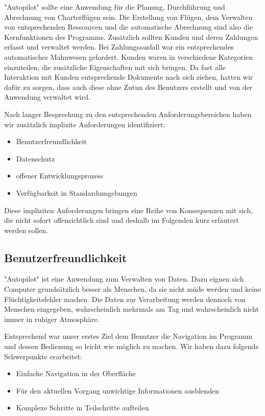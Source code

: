 \documentclass[12pt]{article}
\begin{document}
"Autopilot" sollte eine Anwendung für die Planung, Durchführung und Abrechnung von Charterflügen sein. Die Erstellung von Flügen, dem Verwalten von entsprechenden Ressourcen und die automatische Abrechnung sind also die Kernfunktionen des Programms. Zusätzlich sollten Kunden und deren Zahlungen erfasst und verwaltet werden. Bei Zahlungsausfall war ein entsprechendes automatisches Mahnwesen gefordert. Kunden waren in verschiedene Kategorien einzuteilen, die zusätzliche Eigenschaften mit sich bringen. Da fast alle Interaktion mit Kunden entsprechende Dokumente nach sich ziehen, hatten wir dafür zu sorgen, dass auch diese ohne Zutun des Benutzers erstellt und von der Anwendung verwaltet wird.
\newline

Nach langer Besprechung zu den entsprechenden Anforderungsbereichen haben wir zusätzlich implizite Anforderungen identifiziert:
\begin{itemize}
  \item Benutzerfreundlichkeit
  \item Datenschutz
  \item offener Entwicklungsprozess
  \item Verfügbarkeit in Standardumgebungen
\end{itemize}
\newline

Diese impliziten Anforderungen bringen eine Reihe von Konsequenzen mit sich, die nicht sofort offensichtlich sind und deshalb im Folgenden kurz erläutert werden sollen.

\subsection{Benutzerfreundlichkeit}

"Autopilot" ist eine Anwendung zum Verwalten von Daten. Dazu eignen sich Computer grundsätzlich besser als Menschen, da sie nicht müde werden und keine Flüchtigkeitsfehler machen. Die Daten zur Verarbeitung werden dennoch von Menschen eingegeben, wahrscheinlich mehrmals am Tag und wahrscheinlich nicht immer in ruhiger Atmosphäre.
\newline

Entsprechend war unser erstes Ziel dem Benutzer die Navigation im Programm und dessen Bedienung so leicht wie möglich zu machen. Wir haben dazu folgende Schwerpunkte erarbeitet:
\begin{itemize}
  \item Einfache Navigation in der Oberfläche
  \item Für den aktuellen Vorgang unwichtige Informationen ausblenden
  \item Komplexe Schritte in Teilschritte aufteilen
\end{itemize}
\newline
\end{document}
